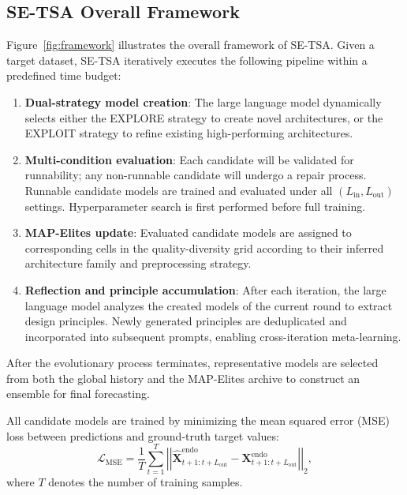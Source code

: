 \subsection{SE-TSA Overall Framework}

Figure~\ref{fig:framework} illustrates the overall framework of SE-TSA. Given a target dataset, SE-TSA iteratively executes the following pipeline within a predefined time budget:
\begin{enumerate}
  \item \textbf{Dual-strategy model creation}: The large language model dynamically selects either the EXPLORE strategy to create novel architectures, or the EXPLOIT strategy to refine existing high-performing architectures.

  \item \textbf{Multi-condition evaluation}: Each candidate will be validated for runnability; any non-runnable candidate will undergo a repair process. Runnable candidate models are trained and evaluated under all $(L_{\text{in}}, L_{\text{out}})$ settings. Hyperparameter search is first performed before full training.

  \item \textbf{MAP-Elites update}: Evaluated candidate models are assigned to corresponding cells in the quality-diversity grid according to their inferred architecture family and preprocessing strategy.

  \item \textbf{Reflection and principle accumulation}: After each iteration, the large language model analyzes the created models of the current round to extract design principles. Newly generated principles are deduplicated and incorporated into subsequent prompts, enabling cross-iteration meta-learning.
\end{enumerate}

After the evolutionary process terminates, representative models are selected from both the global history and the MAP-Elites archive to construct an ensemble for final forecasting.

All candidate models are trained by minimizing the mean squared error (MSE) loss between predictions and ground-truth target values:
\begin{equation}
\mathcal{L}_{\text{MSE}} = \frac{1}{T} \sum_{t=1}^{T} \left|\left| \mathbf{\hat{X}}_{t+1:t+L_{\text{out}}}^{\text{endo}} - \mathbf{X}_{t+1:t+L_{\text{out}}}^{\text{endo}} \right|\right|_{2},
\end{equation}
where $T$ denotes the number of training samples.


